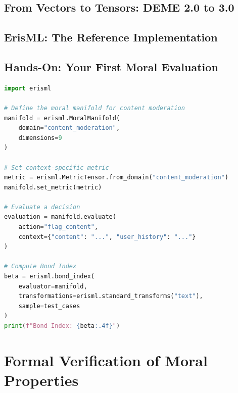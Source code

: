 \documentclass[12pt,letterpaper,twoside,openright]{book}
\theoremstyle{plain}
\theoremstyle{definition}
\theoremstyle{remark}
\newcommand{\R}{\mathbb{R}}
\begin{document}
\section{From Vectors to Tensors: DEME 2.0 to 3.0}

\section{ErisML: The Reference Implementation}

\section{Hands-On: Your First Moral Evaluation}

\begin{lstlisting}[language=Python, caption={Basic moral evaluation with ErisML v3.0}]
import erisml

# Define the moral manifold for content moderation
manifold = erisml.MoralManifold(
    domain="content_moderation",
    dimensions=9
)

# Set context-specific metric
metric = erisml.MetricTensor.from_domain("content_moderation")
manifold.set_metric(metric)

# Evaluate a decision
evaluation = manifold.evaluate(
    action="flag_content",
    context={"content": "...", "user_history": "..."}
)

# Compute Bond Index
beta = erisml.bond_index(
    evaluator=manifold,
    transformations=erisml.standard_transforms("text"),
    sample=test_cases
)
print(f"Bond Index: {beta:.4f}")
\end{lstlisting}


\chapter{Formal Verification of Moral Properties}
\label{ch:verification}
\end{document}
